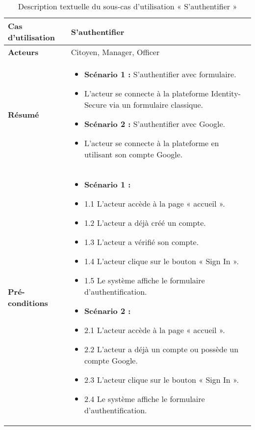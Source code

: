 \begin{longtable}{|>{\arraybackslash}p{4.2cm}|>{\arraybackslash}p{12.5cm}|}
\caption{\centering Description textuelle du sous-cas d'utilisation « S'authentifier »}
\label{tab:backlog:ch2:3} \\
\hline
\rowcolor{gray!20}
\textbf{Cas d'utilisation} & S'authentifier \\
\hline
\endfirsthead

\hline
\endhead

\hline
\endfoot

\hline \hline
\endlastfoot

\textbf{Acteurs} & Citoyen, Manager, Officer \\
\hline

\textbf{Résumé} &
\begin{itemize}[label=]
  \item \textbf{Scénario 1 :} S'authentifier avec formulaire.
  \item L'acteur se connecte à la plateforme Identity-Secure via un formulaire classique.
  \item \textbf{Scénario 2 :} S'authentifier avec Google.
  \item L'acteur se connecte à la plateforme en utilisant son compte Google.
\end{itemize} \\
\hline

\textbf{Pré-conditions} &
\begin{itemize}[label=]
  \item \textbf{Scénario 1 :}
  \item 1.1 L'acteur accède à la page « accueil ».
    \item 1.2 L'acteur a déjà créé un compte.
    \item 1.3 L'acteur a vérifié son compte.
    \item 1.4 L'acteur clique sur le bouton « Sign In ».
    \item 1.5 Le système affiche le formulaire d'authentification.

  \item \textbf{Scénario 2 :}
    \item 2.1 L'acteur accède à la page « accueil ».
    \item 2.2 L'acteur a déjà un compte ou possède un compte Google.
    \item 2.3 L'acteur clique sur le bouton « Sign In ».
    \item 2.4 Le système affiche le formulaire d'authentification.
\end{itemize} \\
\hline


\end{longtable}
